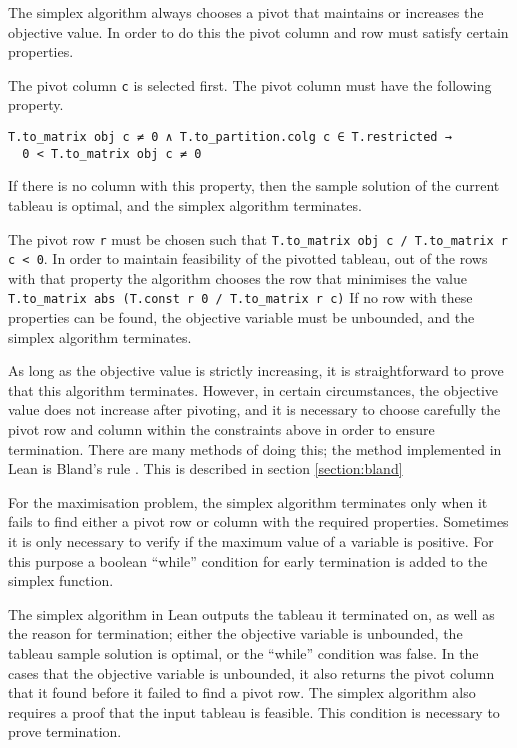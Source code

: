 \documentclass[11pt]{article} %
\begin{document}
The simplex algorithm always chooses a pivot that maintains or increases the objective value. In order to do this the pivot column and row must satisfy certain properties.

The pivot column \lstinline|c| is selected first. The pivot column must have the following property.
\begin{lstlisting}[label=lst:col_spec]
T.to_matrix obj c ≠ 0 ∧ T.to_partition.colg c ∈ T.restricted →
  0 < T.to_matrix obj c ≠ 0
\end{lstlisting} %
If there is no column with this property, then the sample solution of the current tableau is optimal, and the simplex algorithm terminates.

The pivot row \lstinline|r| must be chosen such that \lstinline|T.to_matrix obj c / T.to_matrix r c < 0|. In order to maintain feasibility of the pivotted tableau, out of the rows with that property the algorithm chooses the row that minimises the value \lstinline|T.to_matrix abs (T.const r 0 / T.to_matrix r c)| %
If no row with these properties can be found, the objective variable must be unbounded, and the simplex algorithm terminates.

As long as the objective value is strictly increasing, it is straightforward to prove that this algorithm terminates. However, in certain circumstances, the objective value does not increase after pivoting, and it is necessary to choose carefully the pivot row and column within the constraints above in order to ensure termination. There are many methods of doing this; the method implemented in Lean is Bland's rule \cite{Blands_rule}. This is described in section \ref{section:bland}

For the maximisation problem, the simplex algorithm terminates only when it fails to find either a pivot row or column with the required properties. Sometimes it is only necessary to verify if the maximum value of a variable is positive. For this purpose a boolean ``while'' condition for early termination is added to the simplex function.

The simplex algorithm in Lean outputs the tableau it terminated on, as well as the reason for termination; either the objective variable is unbounded, the tableau sample solution is optimal, or the ``while'' condition was false. In the cases that the objective variable is unbounded, it also returns the pivot column that it found before it failed to find a pivot row. The simplex algorithm also requires a proof that the input tableau is feasible. This condition is necessary to prove termination.
\end{document}
